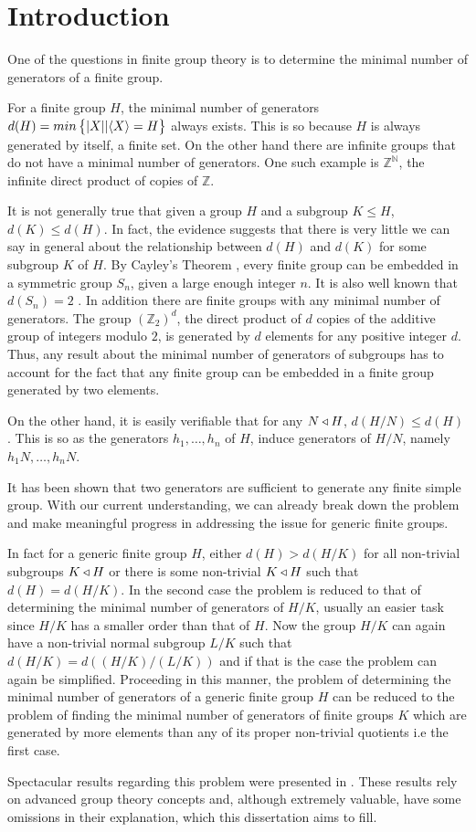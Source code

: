 \chapter*{Introduction}
One of the questions in finite group theory is to determine the minimal number of generators of a finite group.

For a finite group $H$, the minimal number of generators $d(H) = min\left\{| X ||\langle X \rangle = H \right\}$ always exists. This is so because $H$ is always generated by itself, a finite set. On the other hand there are infinite groups that do not have a minimal number of generators. One such example is $\mathbb{Z}^{\mathbb{N}}$, the infinite direct product of copies of $\mathbb{Z}$.

It is not generally true that given a group $H$ and a subgroup $K \le H$, $d(K) \le d(H)$. 
In fact, the evidence suggests that there is very little we can say in general about the relationship between $d(H)$ and $d(K)$ for some subgroup $K$ of $H$. By Cayley's Theorem \cite[p.~52]{RotmanITG}, every finite group can be embedded in a symmetric group $S_n$, given a large enough integer $n$. It is also well known that $d(S_n) = 2$ \cite[p.~24]{RotmanITG}. In addition there are finite groups with any minimal number of generators. The group $(\mathbb{Z}_2)^d$, the direct product of $d$ copies of the additive group of integers modulo $2$, is generated by $d$ elements for any positive integer $d$. Thus, any result about the minimal number of generators of subgroups has to account for the fact that any finite group can be embedded in a finite group generated by two elements.

On the other hand, it is easily verifiable that for any $N \triangleleft H$, $d(H/N) \le d(H)$. 
This is so as the generators $h_1,\ldots,h_n$ of $H$, induce generators of $H/N$, namely $h_1N, \ldots , h_nN$.


It has been shown \cite{AschbacherSAFCG} that two generators are sufficient to generate any finite simple group.
With our current understanding, we can already break down the problem and make meaningful progress in addressing the issue for generic finite groups.

In fact for a generic finite group $H$, either $d(H) > d(H/K)$ for all non-trivial subgroups $K \triangleleft H$ or there is some non-trivial $K \triangleleft H$ such that $d(H) = d(H/K)$. In the second case the problem is reduced to that of determining the minimal number of generators of $H/K$, usually an easier task since $H/K$ has a smaller order than that of $H$. Now the group $H/K$ can again have a non-trivial normal subgroup $L/K$ such that $d(H/K) = d((H/K)/(L/K))$ and if that is the case the problem can again be simplified. Proceeding in this manner, the problem of determining the minimal number of generators of a generic finite group $H$ can be reduced to the problem of finding the minimal number of generators of finite groups $K$ which are generated by more elements than any of its proper non-trivial quotients i.e the first case.

Spectacular results regarding this problem were presented in \cite{DallaVoltaFGNMGAPQ}. These results rely on advanced group theory concepts and, although extremely valuable, have some omissions in their explanation, which this dissertation aims to fill.
